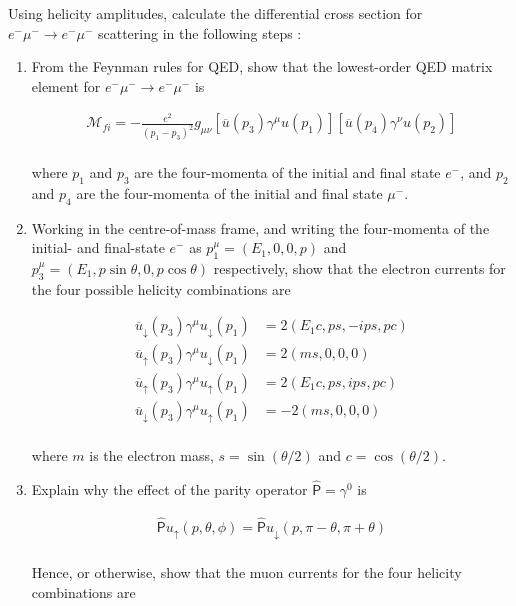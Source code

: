 \begin{problem}{6.7}
    Using helicity amplitudes, calculate the differential cross section for $e^-\mu^- \to e^-\mu^-$ scattering in the following
    steps :

    \begin{enumerate}[label=(\alph*)]
        \item From the Feynman rules for QED, show that the lowest-order QED matrix element for $e^-\mu^- \to e^-\mu^-$ is 
        
        \begin{align*}
            \mathcal{M}_{fi} = -\frac{e^2}{\left(p_1-p_3\right)^2} g_{\mu\nu} \left[\overbar{u}(p_3)\gamma^\mu u(p_1)\right]\left[\overbar{u}(p_4)\gamma^\nu u(p_2)\right]
        \end{align*}\\
        where $p_1$ and $p_3$ are the four-momenta of the initial and final state $e^-$, and $p_2$ and $p_4$ are the four-momenta of the initial and final state $\mu^-$.

        \item Working in the centre-of-mass frame, and writing the four-momenta of the initial- and final-state $e^-$ as $p_1^\mu = (E_1,0,0,p)$ 
        and $p_3^\mu = (E_1,p\sin\theta,0,p\cos\theta)$ respectively, show that the electron currents for the four possible helicity combinations are

        \begin{align*}
            \overbar{u}_\downarrow(p_3)\gamma^\mu u_\downarrow(p_1) &= 2 (E_1 c , ps,-ips, pc) \\
            \overbar{u}_\uparrow(p_3)\gamma^\mu u_\downarrow(p_1)   &= 2 (ms,0,0,0) \\
            \overbar{u}_\uparrow(p_3)\gamma^\mu u_\uparrow(p_1) &= 2 (E_1 c, ps ,ips,pc) \\
            \overbar{u}_\downarrow(p_3)\gamma^\mu u_\uparrow(p_1) &= -2 (ms,0,0,0)
        \end{align*}\\
        where $m$ is the electron mass, $s=\sin(\theta/2)$ and $c=\cos(\theta/2)$.

        \item Explain why the effect of the parity operator $\hat{\mathsf{P}}=\gamma^0$ is 
        
        \begin{align*}
            \hat{\mathsf{P}} u_\uparrow (p,\theta,\phi) = \hat{\mathsf{P}} u_\downarrow (p,\pi-\theta,\pi+\theta)
        \end{align*}\\
        Hence, or otherwise, show that the muon currents for the four helicity combinations are


\end{enumerate}
\end{problem}
